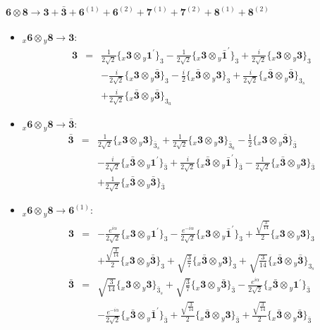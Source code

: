 \documentclass[english]{article}
\newcommand{\rep}[1]{\mathbf{#1}}
\newcommand{\repx}[2]{{}_{#2}\mathbf{#1}}
\newcommand{\subcg}[3]{\big\{ \repx{#1}{x}\otimes\repx{#2}{y}\big\}^{}_{#3}}
\begin{document}
\paragraph*{\Large $\rep{6}\otimes\rep{8}\to\rep{3}+\rep{\bar{3}}+\rep{6}^{(1)}+\rep{6}^{(2)}+\rep{7}^{(1)}+\rep{7}^{(2)}+\rep{8}^{(1)}+\rep{8}^{(2)}$}
\begin{itemize}
\item $\repx{6}{x}\otimes\repx{8}{y}\to\rep{3}$:
\begin{eqnarray*}
\rep{3} &=& \frac{1}{2 \sqrt{2}}\subcg{3}{1^{\prime}}{3}-\frac{1}{2 \sqrt{2}}\subcg{3}{\bar{1}^{\prime}}{3}+\frac{i}{2 \sqrt{2}}\subcg{3}{3}{3} \\ 
 & & -\frac{i}{2 \sqrt{2}}\subcg{3}{\bar{3}}{3}-\frac{i}{2}\subcg{\bar{3}}{3}{3}+\frac{i}{2 \sqrt{2}}\subcg{\bar{3}}{\bar{3}}{3_{s}} \\ 
 & & +\frac{i}{2 \sqrt{2}}\subcg{\bar{3}}{\bar{3}}{3_{a}}
\end{eqnarray*}
\item $\repx{6}{x}\otimes\repx{8}{y}\to\rep{\bar{3}}$:
\begin{eqnarray*}
\rep{\bar{3}} &=& \frac{1}{2 \sqrt{2}}\subcg{3}{3}{\bar{3}_{s}}+\frac{1}{2 \sqrt{2}}\subcg{3}{3}{\bar{3}_{a}}-\frac{1}{2}\subcg{3}{\bar{3}}{\bar{3}} \\ 
 & & -\frac{i}{2 \sqrt{2}}\subcg{\bar{3}}{1^{\prime}}{\bar{3}}+\frac{i}{2 \sqrt{2}}\subcg{\bar{3}}{\bar{1}^{\prime}}{\bar{3}}-\frac{1}{2 \sqrt{2}}\subcg{\bar{3}}{3}{\bar{3}} \\ 
 & & +\frac{1}{2 \sqrt{2}}\subcg{\bar{3}}{\bar{3}}{\bar{3}}
\end{eqnarray*}
\item $\repx{6}{x}\otimes\repx{8}{y}\to\rep{6}^{(1)}$:
\begin{eqnarray*}
\rep{3} &=& -\frac{e^{i \alpha }}{2 \sqrt{2}}\subcg{3}{1^{\prime}}{3}-\frac{e^{-i \alpha }}{2 \sqrt{2}}\subcg{3}{\bar{1}^{\prime}}{3}+\frac{\sqrt{\frac{3}{14}}}{2}\subcg{3}{3}{3} \\ 
 & & +\frac{\sqrt{\frac{3}{14}}}{2}\subcg{3}{\bar{3}}{3}+\sqrt{\frac{3}{7}}\subcg{\bar{3}}{3}{3}+\sqrt{\frac{3}{14}}\subcg{\bar{3}}{\bar{3}}{3_{s}}
\\
\rep{\bar{3}} &=& \sqrt{\frac{3}{14}}\subcg{3}{3}{\bar{3}_{s}}+\sqrt{\frac{3}{7}}\subcg{3}{\bar{3}}{\bar{3}}-\frac{e^{i \alpha }}{2 \sqrt{2}}\subcg{\bar{3}}{1^{\prime}}{\bar{3}} \\ 
 & & -\frac{e^{-i \alpha }}{2 \sqrt{2}}\subcg{\bar{3}}{\bar{1}^{\prime}}{\bar{3}}+\frac{\sqrt{\frac{3}{14}}}{2}\subcg{\bar{3}}{3}{\bar{3}}+\frac{\sqrt{\frac{3}{14}}}{2}\subcg{\bar{3}}{\bar{3}}{\bar{3}}

\end{eqnarray*}
\end{itemize}
\end{document}
